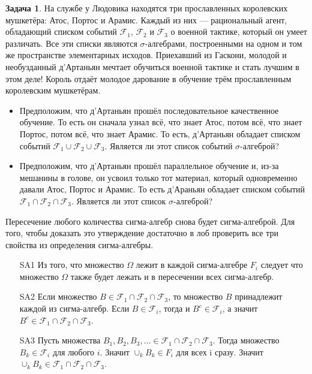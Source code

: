 \documentclass[pdftex, 12pt, a4paper]{article}
\def\F{\ensuremath{\mathcal{F}}} %
\def\s{\ensuremath{\sigma}}
\def \Om{\Omega}
\theoremstyle{definition} %
\newtheorem{problem}{Задача}
\numberwithin{problem}{section}
\numberwithin{blits}{section}
\newcommand{\RNumb}[1]{\uppercase\expandafter{\romannumeral #1\relax}}
\begin{document}
\begin{problem}\label{cap}
На службе у Людовика \RNumb{14} находятся три прославленных королевских мушкетёра: Атос, Портос и Арамис. Каждый из них --- рациональный агент, обладающий списком событий $\F_1$, $\F_2$ и $\F_3$ о военной тактике, который он умеет различать. Все эти списки являются \s-алгебрами, построенными на одном и том же пространстве элементарных исходов. Приехавший из Гаскони, молодой и необузданный д'Артаньян мечтает обучиться военной тактике и стать лучшим в этом деле! Король отдаёт молодое дарование в обучение трём прославленным королевским мушкетёрам.

\begin{itemize}
\item Предположим, что д'Артаньян прошёл последовательное качественное обучение. То есть он сначала узнал всё, что знает Атос, потом всё, что знает Портос, потом всё, что знает Арамис. То есть, д'Артаньян обладает списком событий $\F_1 \cup \F_2 \cup \F_3$. Является ли этот список событий \s-алгеброй? 

\item Предположим, что д'Артаньян прошёл параллельное обучение и, из-за мешанины в голове, он усвоил только тот материал, который одновременно давали Атос, Портос и Арамис. То есть д'Араньян обладает списком событий $\F_1 \cap \F_2 \cap \F_3$. Является ли этот список \s-алгеброй? 
\end{itemize} 

\begin{sol}
Пересечение любого количества сигма-алгебр снова будет сигма-алгеброй. Для того, чтобы доказать это утверждение достаточно в лоб проверить все три свойства из определения сигма-алгебры.

\begin{enumerate}
\item[SA1] Из того, что множество $\Om$ лежит в каждой сигма-алгебре $F_i$  следует что множество $\Om$ также будет лежать и в пересечении всех сигма-алгебр.

\item[SA2] Если множество $B \in  \F_1 \cap \F_2 \cap \F_3$, то множество $B$ принадлежит каждой из сигма-алгебр. Если $B \in \F_i$, тогда и $B^{c} \in \F_i$, а значит $B^{c} \in  \F_1 \cap \F_2 \cap \F_3$.

\item[SA3] Пусть множества $B_1, B_2, B_3, \ldots \in  \F_1 \cap \F_2 \cap \F_3$. Тогда множество $B_k \in \F_i$ для любого $i$. Значит $\cup_{k} B_k \in F_i$ для всех i сразу. Значит $\cup_{k} B_k \in  \F_1 \cap \F_2 \cap \F_3$.
\end{enumerate}



\end{sol}
\end{problem}
\end{document}
